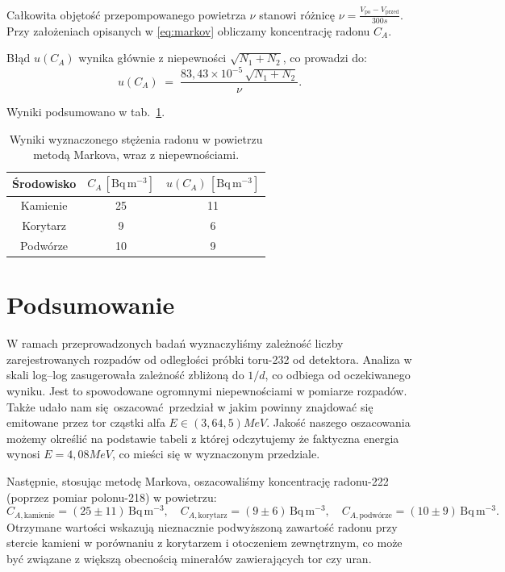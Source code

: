 \documentclass[12pt]{article}
\begin{document}
Całkowita objętość przepompowanego powietrza \(\nu\) stanowi różnicę \(\nu=\frac{V_{\text{po}}-V_{\text{przed}}}{300s}\). Przy założeniach opisanych w \ref{eq:markov} obliczamy koncentrację radonu \(C_A\). 

Błąd \(u(C_A)\) wynika głównie z niepewności \(\sqrt{N_1 + N_2}\), co prowadzi do:
\[
	u(C_A) \;=\; \frac{83{,}43 \times 10^{-5}\,\sqrt{N_1 + N_2}}{\nu}.
\]

Wyniki podsumowano w tab.~\ref{tab:concentration_results}.

\begin{table}[H]
	\centering
	\begin{tabular}{c|cc}
		\toprule
		Środowisko & $C_A\,[\mathrm{Bq\,m^{-3}}]$ & $u(C_A)\,[\mathrm{Bq\,m^{-3}}]$ \\
		\midrule
		Kamienie  & 25 & 11 \\
		Korytarz  & 9  & 6  \\
		Podwórze  & 10 & 9  \\
		\bottomrule
	\end{tabular}
	\caption{Wyniki wyznaczonego stężenia radonu w powietrzu metodą Markova, wraz z niepewnościami.}
	\label{tab:concentration_results}
\end{table}

\section{Podsumowanie}
W ramach przeprowadzonych badań wyznaczyliśmy zależność liczby zarejestrowanych rozpadów od odległości próbki toru-232 od detektora. Analiza w skali log–log zasugerowała zależność zbliżoną do \(1/d\), co odbiega od oczekiwanego wyniku. Jest to spowodowane ogromnymi niepewnościami w pomiarze rozpadów.
Także udało nam się oszacować przedział w jakim powinny znajdować się emitowane przez tor cząstki alfa \(E \in (3{,}6 4{,}5) MeV\). Jakość naszego oszacowania możemy określić na podstawie tabeli \cite{alpha_energy} z której odczytujemy że faktyczna energia wynosi \(E = 4{,}08 MeV\), co mieści się w wyznaczonym przedziale.

Następnie, stosując metodę Markova, oszacowaliśmy koncentrację radonu-222 (poprzez pomiar polonu-218) w powietrzu: 
\[
C_{A,\text{kamienie}}=(25 \pm 11)\,\mathrm{Bq\,m^{-3}}, 
\quad
C_{A,\text{korytarz}}=(9 \pm 6)\,\mathrm{Bq\,m^{-3}}, 
\quad
C_{A,\text{podwórze}}=(10 \pm 9)\,\mathrm{Bq\,m^{-3}}.
\]
Otrzymane wartości wskazują nieznacznie podwyższoną zawartość radonu przy stercie kamieni w porównaniu z korytarzem i otoczeniem zewnętrznym, co może być związane z większą obecnością minerałów zawierających tor czy uran. 
\end{document}
